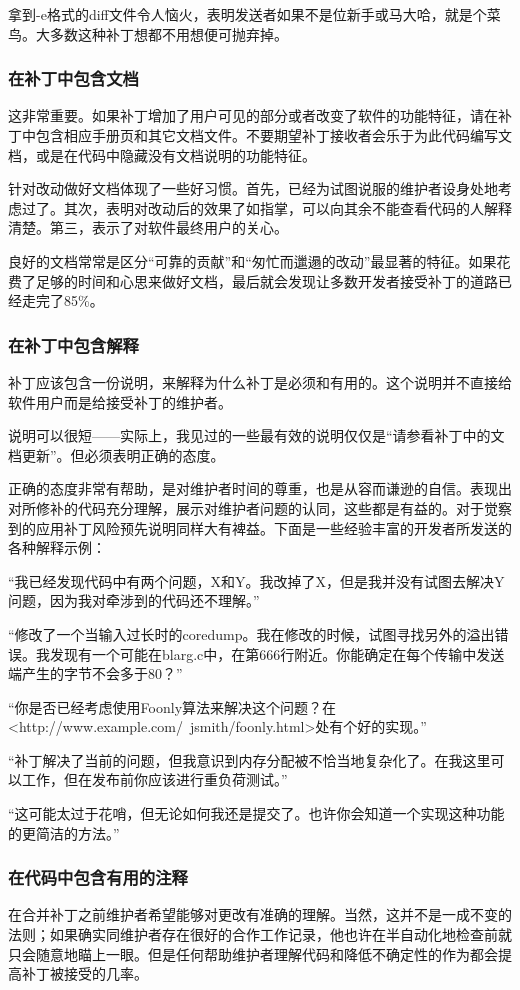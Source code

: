 \documentclass[12pt,oneside]{book}
\begin{document}
拿到-e格式的diff文件令人恼火，表明发送者如果不是位新手或马大哈，就是个菜鸟。大多数这种补丁想都不用想便可抛弃掉。

\subsubsection{在补丁中包含文档}
这非常重要。如果补丁增加了用户可见的部分或者改变了软件的功能特征，请在补丁中包含相应手册页和其它文档文件。不要期望补丁接收者会乐于为此代码编写文档，或是在代码中隐藏没有文档说明的功能特征。

针对改动做好文档体现了一些好习惯。首先，已经为试图说服的维护者设身处地考虑过了。其次，表明对改动后的效果了如指掌，可以向其余不能查看代码的人解释清楚。第三，表示了对软件最终用户的关心。

良好的文档常常是区分“可靠的贡献”和“匆忙而邋遢的改动”最显著的特征。如果花费了足够的时间和心思来做好文档，最后就会发现让多数开发者接受补丁的道路已经走完了85\%{}。

\subsubsection{在补丁中包含解释}
补丁应该包含一份说明，来解释为什么补丁是必须和有用的。这个说明并不直接给软件用户而是给接受补丁的维护者。

说明可以很短——实际上，我见过的一些最有效的说明仅仅是“请参看补丁中的文档更新”。但必须表明正确的态度。

正确的态度非常有帮助，是对维护者时间的尊重，也是从容而谦逊的自信。表现出对所修补的代码充分理解，展示对维护者问题的认同，这些都是有益的。对于觉察到的应用补丁风险预先说明同样大有裨益。下面是一些经验丰富的开发者所发送的各种解释示例：

“我已经发现代码中有两个问题，X和Y。我改掉了X，但是我并没有试图去解决Y问题，因为我对牵涉到的代码还不理解。”

“修改了一个当输入过长时的coredump。我在修改的时候，试图寻找另外的溢出错误。我发现有一个可能在blarg.c中，在第666行附近。你能确定在每个传输中发送端产生的字节不会多于80？”

“你是否已经考虑使用Foonly算法来解决这个问题？在\\ <http://www.example.com/~jsmith/foonly.html>处有个好的实现。”

“补丁解决了当前的问题，但我意识到内存分配被不恰当地复杂化了。在我这里可以工作，但在发布前你应该进行重负荷测试。”

“这可能太过于花哨，但无论如何我还是提交了。也许你会知道一个实现这种功能的更简洁的方法。”

\subsubsection{在代码中包含有用的注释}
在合并补丁之前维护者希望能够对更改有准确的理解。当然，这并不是一成不变的法则；如果确实同维护者存在很好的合作工作记录，他也许在半自动化地检查前就只会随意地瞄上一眼。但是任何帮助维护者理解代码和降低不确定性的作为都会提高补丁被接受的几率。
\end{document}
